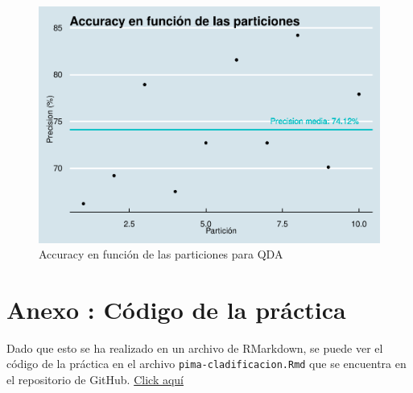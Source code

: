 \documentclass[
]{article}
\begin{document}
\begin{figure}

{\centering \includegraphics[width=0.5\linewidth]{pima-clasificacion_files/figure-latex/10f_qda-1} 

}

\caption{Accuracy en función de las particiones para QDA}\label{fig:10f_qda}
\end{figure}

\hypertarget{anexo-cuxf3digo-de-la-pruxe1ctica}{%
\section{Anexo : Código de la
práctica}\label{anexo-cuxf3digo-de-la-pruxe1ctica}}

Dado que esto se ha realizado en un archivo de RMarkdown, se puede ver
el código de la práctica en el archivo \texttt{pima-cladificacion.Rmd}
que se encuentra en el repositorio de GitHub.
\href{https://github.com/DanelArias-Dreyton257/DATCOM-Intro}{Click aquí}
\end{document}
